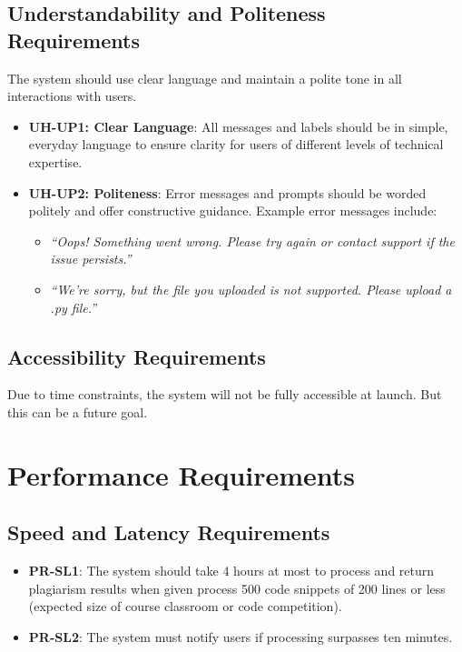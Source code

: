 \documentclass[12pt]{article}
\begin{document}
\subsection{Understandability and Politeness Requirements}
The system should use clear language and maintain a polite tone in all 
interactions with users.
\begin{itemize}
    \item \textbf{UH-UP1: Clear Language}: All messages and labels should be in simple, 
    everyday language to ensure clarity for users of different levels of 
    technical expertise.
    
    \item \textbf{UH-UP2: Politeness}: Error messages and prompts should be worded 
    politely and offer constructive guidance. Example error messages include:
    \begin{itemize}
        \item \textit{“Oops! Something went wrong. Please try again or contact 
        support if the issue persists.”}
        \item \textit{“We're sorry, but the file you uploaded is not supported. 
        Please upload a .py file.”}
    \end{itemize}
\end{itemize}

\subsection{Accessibility Requirements}
Due to time constraints, the system will not be fully accessible at launch. But this can be a future goal.

\section{Performance Requirements}
\subsection{Speed and Latency Requirements}
\begin{itemize}
    \item \textbf{PR-SL1}: The system should take 4 hours at most to process 
    and return plagiarism results when given process 500 code snippets of 200 
    lines or less (expected size of course classroom or code competition).
    \item \textbf{PR-SL2}: The system must notify users if processing surpasses ten minutes.
\end{itemize}
\end{document}
